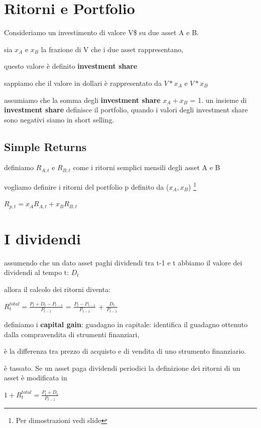 \documentclass[a4paper,11pt]{report}
\begin{document}
{\section{Ritorni e Portfolio}
	Consideriamo un investimento di valore V\$ su due asset A e B.

	sia $x_A$ e $x_B$ la frazione di V che i due asset rappresentano,

	questo valore è definito \textbf{investment share}

	sappiamo che il valore in dollari è rappresentato da $V*x_A$ e $V*x_B$

	assumiamo che la somma degli \textbf{investment share} $x_A + x_B$ = 1. \newline
	un insieme di \textbf{investment share} definisce il portfolio,
	quando i valori degli investment share sono negativi siamo in short selling.
\subsection{Simple Returns}
	definiamo $R_{A,t}$ e $R_{B,t}$ come i ritorni semplici mensili degli asset A e B

	vogliamo definire i ritorni del portfolio p definito da ($x_A,x_B$) \footnote{Per dimostrazioni vedi slide}

\begin{center}
	$R_{p,t} = x_A R_{A,t} + x_B R_{B,t}$
\end{center}
\section{I dividendi}
	assumendo che un dato asset paghi dividendi tra t-1 e t  abbiamo il valore dei dividendi al tempo t: $D_t$
	
	allora il calcolo dei ritorni diventa:

\begin{center}
	$R_t^{total} = {\frac{P_t + D_t - P_{t-1}}{P_{t-1}}}$ = ${\frac {P_t - P_{t-1}}{P_{t-1}}}$
	 + ${\frac {D_t}{P_{t-1}}}$
\end{center}
 	definiamo i \textbf{capital gain}: guadagno in capitale: identifica il guadagno ottenuto dalla compravendita di strumenti finanziari,

	è la differenza tra prezzo di acquisto e di vendita di uno strumento finanziario.

	è tassato. \newline
	Se un asset paga dividendi periodici la definizione dei ritorni di un asset è modificata in
\begin{center}
	$1+R_t^{total}= {\frac {P_t + D_t}{P_{t-1}}} $
\end{center}

}
\end{document}
